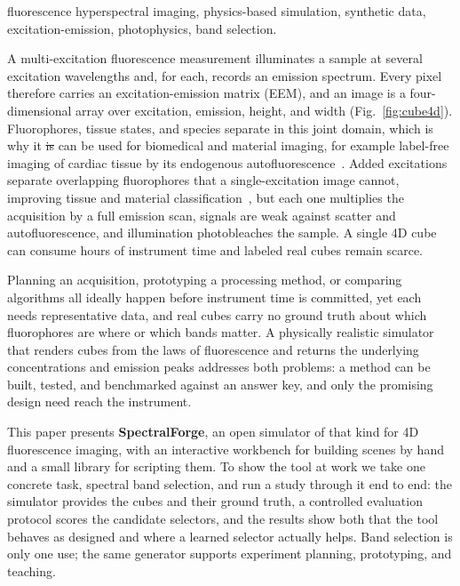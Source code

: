 \documentclass{article}
\makeatletter
\renewcommand\section{\@startsection{section}{1}{\z@}{9pt}{4pt}{\normalfont\bfseries}}
\providecommand{\DIFadd}[1]{{\protect\color[rgb]{0.85,0,0}#1}} %
\providecommand{\DIFdel}[1]{{\protect\color[gray]{0.5}\sout{#1}}} %
\providecommand{\DIFaddbegin}{} %
\providecommand{\DIFaddend}{} %
\providecommand{\DIFdelbegin}{} %
\providecommand{\DIFdelend}{} %
\let\sout@orig\sout %
\renewcommand{\sout}[1]{\ifmmode\text{\sout@orig{\ensuremath{#1}}}\else\sout@orig{#1}\fi} %
\makeatother
\begin{document}
\begin{keywords}
fluorescence hyperspectral imaging, physics-based simulation, synthetic data,
excitation-emission, photophysics, band selection.
\end{keywords}

\section{Introduction}
A multi-excitation fluorescence measurement illuminates a sample at several excitation
wavelengths and, for each, records an emission spectrum. Every pixel therefore carries an
excitation-emission matrix (EEM), and an image is a four-dimensional array over excitation,
emission, height, and width (Fig.~\ref{fig:cube4d}). Fluorophores, tissue states, and species
separate in this joint domain, which is why it \DIFdelbegin \DIFdel{is }\DIFdelend \DIFaddbegin \DIFadd{can be }\DIFaddend used for biomedical and material imaging,
for example label-free imaging of cardiac tissue by its endogenous
autofluorescence~\cite{ref_mercader,ref_gil}. Added excitations separate overlapping
fluorophores that a single-excitation image cannot, improving tissue and material
classification~\cite{ref_chil4d,ref_chillichen,ref_hunanyan}, but each one multiplies the
acquisition by a full emission scan, signals are weak against scatter and autofluorescence,
and illumination photobleaches the sample. A single 4D cube can consume hours of
instrument time and labeled real cubes remain scarce.

Planning an acquisition, prototyping a processing method, or comparing algorithms all
ideally happen before instrument time is committed, yet each needs representative data, and
real cubes carry no ground truth about which fluorophores are where or which bands matter. A
physically realistic simulator that renders cubes from the laws of fluorescence and returns
the underlying concentrations and emission peaks addresses both problems: a method can be
built, tested, and benchmarked against an answer key, and only the promising design need
reach the instrument.

This paper presents \textbf{SpectralForge}, an open simulator of that kind for 4D
fluorescence imaging, with an interactive workbench for building scenes by hand and a small
library for scripting them. To show the tool at work we take one concrete task, spectral
band selection, and run a study through it end to end: the simulator provides the cubes and
their ground truth, a controlled evaluation protocol scores the candidate selectors, and
the results show both that the tool behaves as designed and where a learned selector
actually helps. Band selection is only one use; the same generator supports experiment
planning, prototyping, and teaching.
\end{document}
